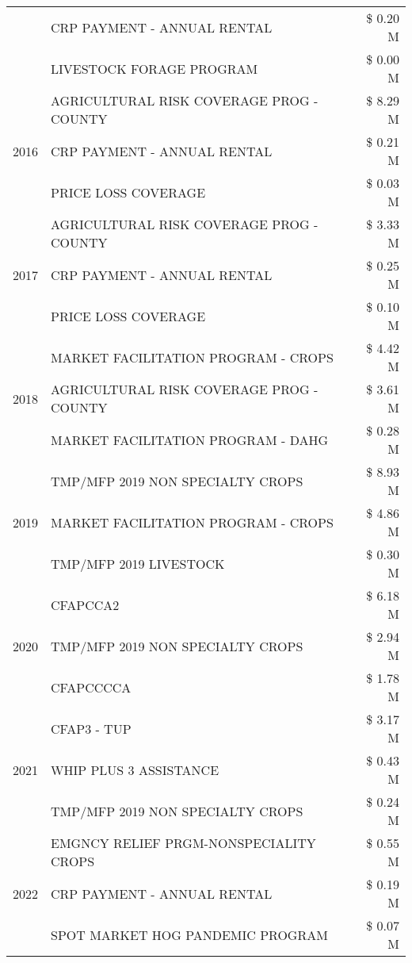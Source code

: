 \begin{tabular}{llr}
 & CRP PAYMENT - ANNUAL RENTAL & \$ 0.20 M \\
 & LIVESTOCK FORAGE PROGRAM & \$ 0.00 M \\
\cline{1-3}
\multirow[t]{3}{*}{2016} & AGRICULTURAL RISK COVERAGE PROG - COUNTY & \$ 8.29 M \\
 & CRP PAYMENT - ANNUAL RENTAL & \$ 0.21 M \\
 & PRICE LOSS COVERAGE & \$ 0.03 M \\
\cline{1-3}
\multirow[t]{3}{*}{2017} & AGRICULTURAL RISK COVERAGE PROG - COUNTY & \$ 3.33 M \\
 & CRP PAYMENT - ANNUAL RENTAL & \$ 0.25 M \\
 & PRICE LOSS COVERAGE & \$ 0.10 M \\
\cline{1-3}
\multirow[t]{3}{*}{2018} & MARKET FACILITATION PROGRAM - CROPS & \$ 4.42 M \\
 & AGRICULTURAL RISK COVERAGE PROG - COUNTY & \$ 3.61 M \\
 & MARKET FACILITATION PROGRAM - DAHG & \$ 0.28 M \\
\cline{1-3}
\multirow[t]{3}{*}{2019} & TMP/MFP 2019 NON SPECIALTY CROPS & \$ 8.93 M \\
 & MARKET FACILITATION PROGRAM - CROPS & \$ 4.86 M \\
 & TMP/MFP 2019 LIVESTOCK & \$ 0.30 M \\
\cline{1-3}
\multirow[t]{3}{*}{2020} & CFAPCCA2 & \$ 6.18 M \\
 & TMP/MFP 2019 NON SPECIALTY CROPS & \$ 2.94 M \\
 & CFAPCCCCA & \$ 1.78 M \\
\cline{1-3}
\multirow[t]{3}{*}{2021} & CFAP3 - TUP & \$ 3.17 M \\
 & WHIP PLUS 3 ASSISTANCE & \$ 0.43 M \\
 & TMP/MFP 2019 NON SPECIALTY CROPS & \$ 0.24 M \\
\cline{1-3}
\multirow[t]{3}{*}{2022} & EMGNCY RELIEF PRGM-NONSPECIALITY CROPS & \$ 0.55 M \\
 & CRP PAYMENT - ANNUAL RENTAL & \$ 0.19 M \\
 & SPOT MARKET HOG PANDEMIC PROGRAM & \$ 0.07 M \\
\cline{1-3}
\bottomrule
\end{tabular}

